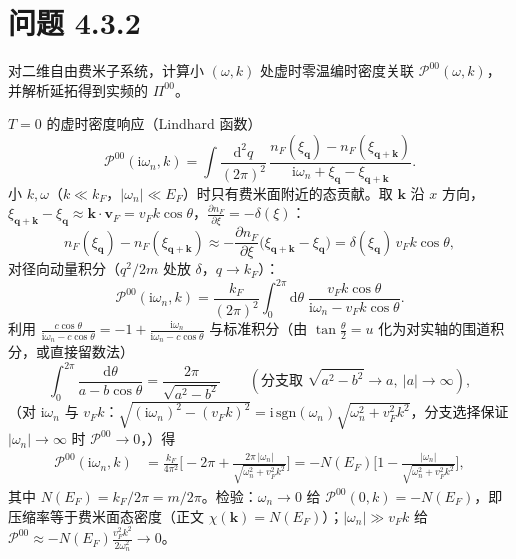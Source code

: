 \section*{问题 4.3.2}
\begin{problem}
对二维自由费米子系统，计算小 $(\omega,k)$ 处虚时零温编时密度关联 $\mathcal{P}^{00}(\omega,k)$，并解析延拓得到实频的 $\Pi^{00}$。
\end{problem}
\solution
$T=0$ 的虚时密度响应（Lindhard 函数）
\begin{equation*}
\mathcal{P}^{00}(\mathrm{i}\omega_n,k)
=\int\frac{\mathrm{d}^2q}{(2\pi)^2}\,
\frac{n_F(\xi_{\pmb q})-n_F(\xi_{\pmb q+\pmb k})}{\mathrm{i}\omega_n+\xi_{\pmb q}-\xi_{\pmb q+\pmb k}} .
\end{equation*}
小 $k,\omega$（$k\ll k_F$，$|\omega_n|\ll E_F$）时只有费米面附近的态贡献。取 $\pmb k$ 沿 $x$ 方向，$\xi_{\pmb q+\pmb k}-\xi_{\pmb q}\approx\pmb k\cdot\pmb v_F=v_Fk\cos\theta$，$\frac{\partial n_F}{\partial\xi}=-\delta(\xi)$：
\begin{equation*}
n_F(\xi_{\pmb q})-n_F(\xi_{\pmb q+\pmb k})
\approx-\frac{\partial n_F}{\partial\xi}\big(\xi_{\pmb q+\pmb k}-\xi_{\pmb q}\big)
=\delta(\xi_{\pmb q})\,v_Fk\cos\theta ,
\end{equation*}
对径向动量积分（$q^2/2m$ 处放 $\delta$，$q\to k_F$）：
\begin{equation*}
\mathcal{P}^{00}(\mathrm{i}\omega_n,k)
=\frac{k_F}{(2\pi)^2}\int_0^{2\pi}\mathrm{d}\theta\;
\frac{v_Fk\cos\theta}{\mathrm{i}\omega_n-v_Fk\cos\theta} .
\end{equation*}
利用 $\frac{c\cos\theta}{\mathrm{i}\omega_n-c\cos\theta}=-1+\frac{\mathrm{i}\omega_n}{\mathrm{i}\omega_n-c\cos\theta}$ 与标准积分（由 $\tan\frac{\theta}{2}=u$ 化为对实轴的围道积分，或直接留数法）
\begin{equation*}
\int_0^{2\pi}\frac{\mathrm{d}\theta}{a-b\cos\theta}=\frac{2\pi}{\sqrt{a^2-b^2}}\qquad
(\text{分支取 }\sqrt{a^2-b^2}\to a,\ |a|\to\infty),
\end{equation*}
（对 $\mathrm{i}\omega_n$ 与 $v_Fk$：$\sqrt{(\mathrm{i}\omega_n)^2-(v_Fk)^2}=\mathrm{i}\,\mathrm{sgn}(\omega_n)\sqrt{\omega_n^2+v_F^2k^2}$，分支选择保证 $|\omega_n|\to\infty$ 时 $\mathcal{P}^{00}\to0$，）得
\begin{align*}
\mathcal{P}^{00}(\mathrm{i}\omega_n,k)
&=\frac{k_F}{4\pi^2}\Big[-2\pi+\frac{2\pi\,|\omega_n|}{\sqrt{\omega_n^2+v_F^2k^2}}\Big]
=-N(E_F)\Big[1-\frac{|\omega_n|}{\sqrt{\omega_n^2+v_F^2k^2}}\Big],
\end{align*}
其中 $N(E_F)=k_F/2\pi=m/2\pi$。检验：$\omega_n\to0$ 给 $\mathcal{P}^{00}(0,k)=-N(E_F)$，即压缩率等于费米面态密度（正文 $\chi(\pmb{k})=N(E_F)$）；$|\omega_n|\gg v_Fk$ 给 $\mathcal{P}^{00}\approx-N(E_F)\frac{v_F^2k^2}{2\omega_n^2}\to0$。


